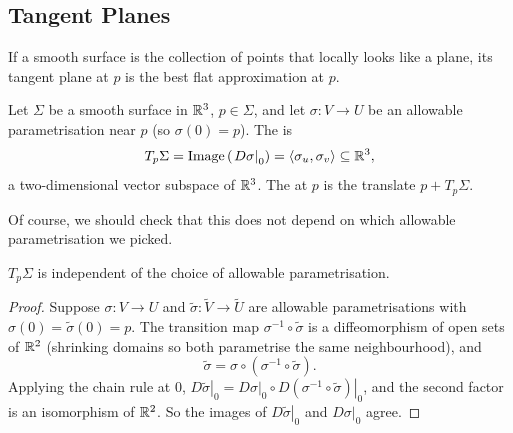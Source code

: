 \documentclass[a4paper]{scrartcl}
\begin{document}
\subsection{Tangent Planes}

If a smooth surface is the collection of points that locally looks like a plane, its tangent plane at $p$ is the best flat approximation at $p$.

\begin{definition}
    Let $\Sigma$ be a smooth surface in $\mathbb{R}^3$, $p \in \Sigma$, and let $\sigma: V \rightarrow U$ be an allowable parametrisation near $p$ (so $\sigma(0) = p$). The  is
    $$
    T_p \Sigma = \operatorname{Image}\left(\left.D\sigma\right|_0\right) = \langle \sigma_u, \sigma_v \rangle \subseteq \mathbb{R}^3,
    $$
    a two-dimensional vector subspace of $\mathbb{R}^3$. The  at $p$ is the translate $p + T_p \Sigma$.
    \begin{center}
    \end{center}
\end{definition}

Of course, we should check that this does not depend on which allowable parametrisation we picked.

\begin{lemma}
    $T_p \Sigma$ is independent of the choice of allowable parametrisation.
\end{lemma}
\begin{proof}
    Suppose $\sigma: V \rightarrow U$ and $\tilde{\sigma}: \tilde{V} \rightarrow \tilde{U}$ are allowable parametrisations with $\sigma(0) = \tilde{\sigma}(0) = p$. The transition map $\sigma^{-1} \circ \tilde{\sigma}$ is a diffeomorphism of open sets of $\mathbb{R}^2$ (shrinking domains so both parametrise the same neighbourhood), and
    $$
    \tilde{\sigma} = \sigma \circ (\sigma^{-1} \circ \tilde{\sigma}).
    $$
    Applying the chain rule at $0$, $\left.D\tilde{\sigma}\right|_0 = \left.D\sigma\right|_0 \circ \left.D(\sigma^{-1} \circ \tilde{\sigma})\right|_0$, and the second factor is an isomorphism of $\mathbb{R}^2$. So the images of $\left.D\tilde{\sigma}\right|_0$ and $\left.D\sigma\right|_0$ agree.
\end{proof}
\end{document}
